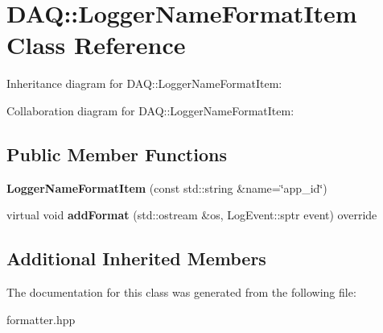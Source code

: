 \hypertarget{classDAQ_1_1LoggerNameFormatItem}{}\section{D\+AQ\+:\+:Logger\+Name\+Format\+Item Class Reference}
\label{classDAQ_1_1LoggerNameFormatItem}


Inheritance diagram for D\+AQ\+:\+:Logger\+Name\+Format\+Item\+:


Collaboration diagram for D\+AQ\+:\+:Logger\+Name\+Format\+Item\+:
\subsection*{Public Member Functions}
\begin{DoxyCompactItemize}
\item 
\mbox{\label{classDAQ_1_1LoggerNameFormatItem_a1906f75ef36f67be54944c05887bbd5a}} 
{\bfseries Logger\+Name\+Format\+Item} (const std\+::string \&name=\char`\"{}app\+\_\+id\char`\"{})
\item 
\mbox{\label{classDAQ_1_1LoggerNameFormatItem_aedf012578fff5ed3bcef5de642667852}} 
virtual void {\bfseries add\+Format} (std\+::ostream \&os, Log\+Event\+::sptr event) override
\end{DoxyCompactItemize}
\subsection*{Additional Inherited Members}


The documentation for this class was generated from the following file\+:\begin{DoxyCompactItemize}
\item 
formatter.\+hpp\end{DoxyCompactItemize}
